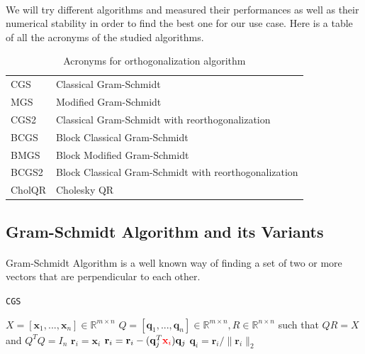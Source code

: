 \paragraph*{}
We will try different algorithms and measured their performances as well as their numerical stability in order to find the best one for our use case. Here is a table of all the acronyms of the studied algorithms.

\begin{table}[h!]
\centering
\begin{tabular}{|l|l|} 
 \hline
 CGS & Classical Gram-Schmidt \\ 
 MGS & Modified Gram-Schmidt \\
 CGS2 & Classical Gram-Schmidt with reorthogonalization \\
 BCGS & Block Classical Gram-Schmidt \\
 BMGS & Block Modified Gram-Schmidt \\
 BCGS2 & Block Classical Gram-Schmidt with reorthogonalization \\
 CholQR & Cholesky QR \\
 \hline
\end{tabular}
\caption{Acronyms for orthogonalization algorithm}
\label{table:1}
\end{table}

\subsection{Gram-Schmidt Algorithm and its Variants}
\paragraph*{}
Gram-Schmidt Algorithm is a well known way of finding a set of two or more vectors that are perpendicular to each other.

\begin{algorithm}
\caption{\texttt{CGS}}\label{alg:cgs}
\begin{algorithmic}[1]
\Require $X = [\mathbf{x}_1,...,\mathbf{x}_n] \in \mathbb{R}^{m\times n}$
\Ensure $ Q=[\mathbf{q}_1,...,\mathbf{q}_n] \in \mathbb{R}^{m\times n}, R \in \mathbb{R}^{n\times n}$ such that $QR = X$ and $Q^TQ=I_n$
    \State $\mathbf{r}_i = \mathbf{x}_i$
        \State $\mathbf{r}_i = \mathbf{r}_i - (\mathbf{q}_j^T\textcolor{red}{\mathbf{x}_i})\mathbf{q}_j$
    \EndFor
    \State $\mathbf{q}_i = \mathbf{r}_i/ \lVert \mathbf{r}_i \rVert_2$
\EndFor
\end{algorithmic}
\end{algorithm}

